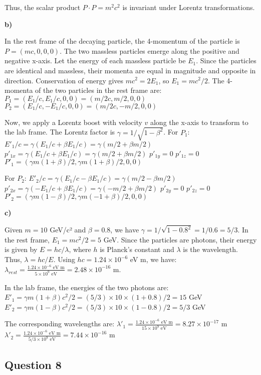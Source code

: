 \documentclass{article}
\begin{document}
Thus, the scalar product $P \cdot P = m^2 c^2$ is invariant under Lorentz transformations.

\textbf{b)}

In the rest frame of the decaying particle, the 4-momentum of the particle is $P = (mc, 0, 0, 0)$.
The two massless particles emerge along the positive and negative x-axis. Let the energy of each massless particle be $E_1$. Since the particles are identical and massless, their momenta are equal in magnitude and opposite in direction. Conservation of energy gives $mc^2 = 2E_1$, so $E_1 = mc^2/2$. The 4-momenta of the two particles in the rest frame are:
$P_1 = (E_1/c, E_1/c, 0, 0) = (m/2 c, m/2, 0, 0)$
$P_2 = (E_1/c, -E_1/c, 0, 0) = (m/2 c, -m/2, 0, 0)$

Now, we apply a Lorentz boost with velocity $v$ along the x-axis to transform to the lab frame. The Lorentz factor is $\gamma = 1/\sqrt{1 - \beta^2}$.
For $P_1$:
$E'_1/c = \gamma (E_1/c + \beta E_1/c) = \gamma (m/2 + \beta m/2)$
$p'_{1x} = \gamma (E_1/c + \beta E_1/c) = \gamma (m/2 + \beta m/2)$
$p'_{1y} = 0$
$p'_{1z} = 0$
$P'_1 = (\gamma m(1+\beta)/2, \gamma m(1+\beta)/2, 0, 0)$

For $P_2$:
$E'_2/c = \gamma (E_1/c - \beta E_1/c) = \gamma (m/2 - \beta m/2)$
$p'_{2x} = \gamma (-E_1/c + \beta E_1/c) = \gamma (-m/2 + \beta m/2)$
$p'_{2y} = 0$
$p'_{2z} = 0$
$P'_2 = (\gamma m(1-\beta)/2, \gamma m(-1+\beta)/2, 0, 0)$

\textbf{c)}

Given $m = 10$ GeV/c² and $\beta = 0.8$, we have $\gamma = 1/\sqrt{1 - 0.8^2} = 1/0.6 = 5/3$.
In the rest frame, $E_1 = mc^2/2 = 5$ GeV. Since the particles are photons, their energy is given by $E = hc/\lambda$, where $h$ is Planck's constant and $\lambda$ is the wavelength. Thus, $\lambda = hc/E$. Using $hc = 1.24 \times 10^{-6}$ eV m, we have:
$\lambda_{rest} = \frac{1.24 \times 10^{-6} \text{ eV m}}{5 \times 10^9 \text{ eV}} = 2.48 \times 10^{-16}$ m.

In the lab frame, the energies of the two photons are:
$E'_1 = \gamma m(1+\beta)c^2/2 = (5/3) \times 10 \times (1+0.8)/2 = 15$ GeV
$E'_2 = \gamma m(1-\beta)c^2/2 = (5/3) \times 10 \times (1-0.8)/2 = 5/3$ GeV

The corresponding wavelengths are:
$\lambda'_1 = \frac{1.24 \times 10^{-6} \text{ eV m}}{15 \times 10^9 \text{ eV}} = 8.27 \times 10^{-17}$ m
$\lambda'_2 = \frac{1.24 \times 10^{-6} \text{ eV m}}{5/3 \times 10^9 \text{ eV}} = 7.44 \times 10^{-16}$ m

\subsection{Question 8}
\end{document}
